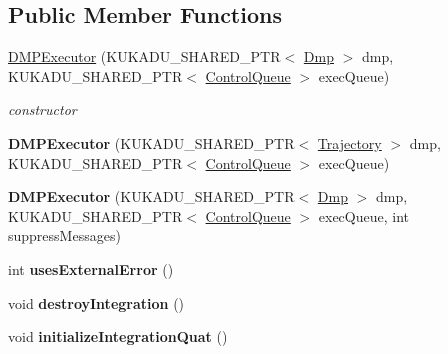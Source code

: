 \subsection*{Public Member Functions}
\begin{DoxyCompactItemize}
\item 
\hyperlink{classkukadu_1_1DMPExecutor_a373f61b9ca50f365edbbbe2c5cfab93d}{D\-M\-P\-Executor} (K\-U\-K\-A\-D\-U\-\_\-\-S\-H\-A\-R\-E\-D\-\_\-\-P\-T\-R$<$ \hyperlink{classkukadu_1_1Dmp}{Dmp} $>$ dmp, K\-U\-K\-A\-D\-U\-\_\-\-S\-H\-A\-R\-E\-D\-\_\-\-P\-T\-R$<$ \hyperlink{classkukadu_1_1ControlQueue}{Control\-Queue} $>$ exec\-Queue)
\begin{DoxyCompactList}\small\item\em constructor \end{DoxyCompactList}\item 
\hypertarget{classkukadu_1_1DMPExecutor_aee2adcadd6e701b75fb7b94b17f083ab}{{\bfseries D\-M\-P\-Executor} (K\-U\-K\-A\-D\-U\-\_\-\-S\-H\-A\-R\-E\-D\-\_\-\-P\-T\-R$<$ \hyperlink{classkukadu_1_1Trajectory}{Trajectory} $>$ dmp, K\-U\-K\-A\-D\-U\-\_\-\-S\-H\-A\-R\-E\-D\-\_\-\-P\-T\-R$<$ \hyperlink{classkukadu_1_1ControlQueue}{Control\-Queue} $>$ exec\-Queue)}\label{classkukadu_1_1DMPExecutor_aee2adcadd6e701b75fb7b94b17f083ab}

\item 
\hypertarget{classkukadu_1_1DMPExecutor_a354052531aca0fa4fbc35f6f075a7763}{{\bfseries D\-M\-P\-Executor} (K\-U\-K\-A\-D\-U\-\_\-\-S\-H\-A\-R\-E\-D\-\_\-\-P\-T\-R$<$ \hyperlink{classkukadu_1_1Dmp}{Dmp} $>$ dmp, K\-U\-K\-A\-D\-U\-\_\-\-S\-H\-A\-R\-E\-D\-\_\-\-P\-T\-R$<$ \hyperlink{classkukadu_1_1ControlQueue}{Control\-Queue} $>$ exec\-Queue, int suppress\-Messages)}\label{classkukadu_1_1DMPExecutor_a354052531aca0fa4fbc35f6f075a7763}

\item 
\hypertarget{classkukadu_1_1DMPExecutor_a97054e488e997d275cdcc8d58554a3e6}{int {\bfseries uses\-External\-Error} ()}\label{classkukadu_1_1DMPExecutor_a97054e488e997d275cdcc8d58554a3e6}

\item 
\hypertarget{classkukadu_1_1DMPExecutor_aa67aae8df58ef660f694a0c322fa251e}{void {\bfseries destroy\-Integration} ()}\label{classkukadu_1_1DMPExecutor_aa67aae8df58ef660f694a0c322fa251e}

\item 
\hypertarget{classkukadu_1_1DMPExecutor_a30488907c4a7f95040137aaa22f7783d}{void {\bfseries initialize\-Integration\-Quat} ()}\label{classkukadu_1_1DMPExecutor_a30488907c4a7f95040137aaa22f7783d}


\end{DoxyCompactItemize}
